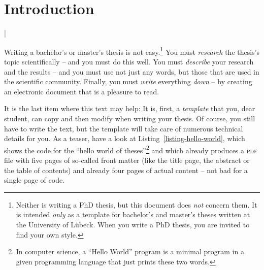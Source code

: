 \documentclass[english,version-2019-11]{uzl-thesis}
\begin{document}
%
%



\chapter{Introduction}



%

\lstMakeShortInline[style=code,style=inline,language={[LaTeX]tex},moretexcs={chapter}]|

Writing a bachelor's or master's thesis is not easy.\footnote{Neither
  is writing a PhD thesis, but this document does \emph{not} concern
  them. It is intended \emph{only} as a template for bachelor's and
  master's theses written at the University of Lübeck. When you write
  a PhD thesis, you are invited to find your own style.} You must
\emph{research} the thesis's topic scientifically 
-- and you must do 
this well. You must \emph{describe} your research and the results --
and you must use not just any words, but those that are used in the
scientific community. Finally, you must \emph{write} everything
\emph{down} -- by creating an electronic document that is a pleasure
to read.

It is the last item where this text may help: It is, first, a
\emph{template} that you, dear student, can copy and then modify when
writing your thesis. Of course, you still have to write the text, but
the template will take care of numerous technical details for you. As
a teaser, have a look at Listing~\vref{listing-hello-world}, which 
shows the code for the ``hello world of theses''\footnote{In computer
  science, a ``Hello World'' program is a minimal program in a given
  programming language that   just prints these two words.} and which
already produces a \textsc{pdf} file with five pages of so-called front
matter (like the title page, the abstract or the table of contents)
and already four pages of actual content -- not bad for a single page
of code.
\end{document}
